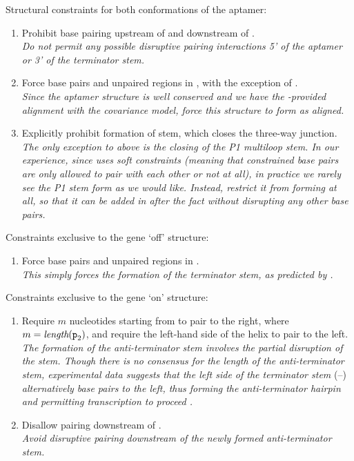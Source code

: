 {\large Structural constraints for both conformations of the \grb aptamer:}
\begin{enumerate}
\item Prohibit base pairing upstream of  and
downstream of . \\[1.5ex] {\em Do not permit any possible disruptive pairing
interactions 5' of the aptamer or 3' of the terminator stem.}
\item Force base pairs and unpaired regions in , with
the exception of . \\[1.5ex] {\em Since the aptamer structure is well
conserved and we have the \infernal-provided alignment with the
covariance model, force this structure to form as aligned.}
\item Explicitly prohibit formation of  stem, which closes the
three-way junction. \\[1.5ex] {\em The only exception to above is the closing of the
P1 multiloop stem. In our experience, since \rfold uses soft constraints
(meaning that constrained base pairs are only allowed to pair with each other
or not at all), in practice we rarely see the P1 stem form as we would like.
Instead, restrict it from forming at all, so that it can be added in after the
fact without disrupting any other base pairs.}
\end{enumerate}
{\large Constraints exclusive to the gene `off' structure:}
\begin{enumerate}
\item Force base pairs and unpaired regions in . \\[1.5ex] {\em This simply
forces the formation of the terminator stem, as predicted by \tthp.}
\end{enumerate}
{\large Constraints exclusive to the gene `on' structure:}
\begin{enumerate}
\item Require $m$ nucleotides starting from  to pair to the
right, where $m = \textit{length}({\text{\mbox{\tt p}}}_{\text{2}})$, and require the left-hand side of the
 helix to pair to the left. \\[1.5ex] {\em The formation of the
anti-terminator stem involves the partial disruption of the  stem.
Though there is no consensus for the length of the anti-terminator stem,
experimental data suggests that the left side of the terminator stem}
(--) {\em alternatively base pairs to the left,
thus forming the anti-terminator hairpin and permitting transcription to proceed
\citep{mandal:2004ja}.}
\item Disallow pairing downstream of . \\[1.5ex] {\em Avoid
disruptive pairing downstream of the newly formed anti-terminator stem.}
\end{enumerate}


